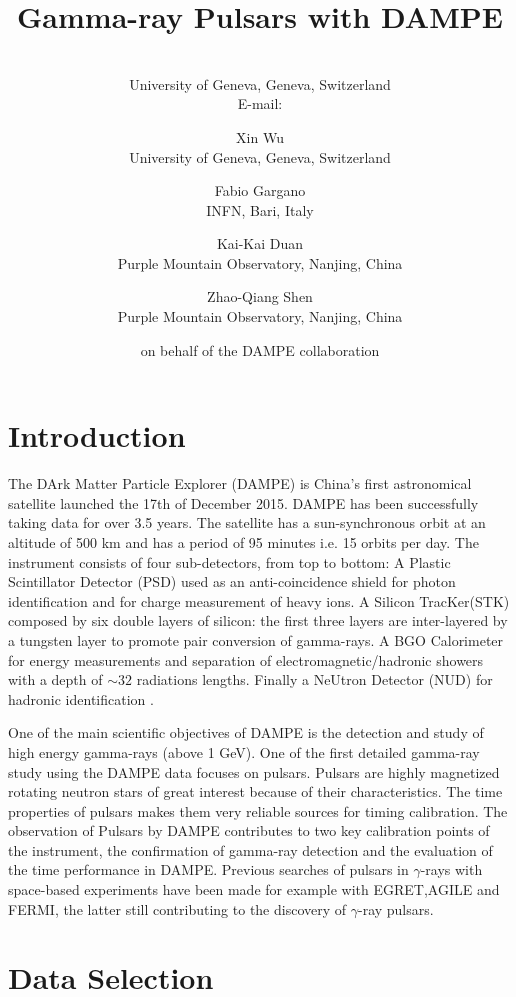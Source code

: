 \documentclass{PoS}
\title{Gamma-ray Pulsars with DAMPE}
\author{\speaker{Maria Munoz}\\
        University of Geneva, Geneva, Switzerland\\
        E-mail: \email{maria.munoz@unige.ch}}
\author{Xin Wu\\
        University of Geneva, Geneva, Switzerland}
\author{Fabio Gargano\\
        INFN, Bari, Italy}
\author{Kai-Kai Duan\\
        Purple Mountain Observatory, Nanjing, China}
\author{Zhao-Qiang Shen\\
        Purple Mountain Observatory, Nanjing, China}
\author{on behalf of the DAMPE collaboration}
\begin{document}


\section{Introduction}


The DArk Matter Particle Explorer (DAMPE) is China's first astronomical satellite launched the 17th of December 2015. DAMPE has been successfully taking data for over 3.5 years.
The satellite has a sun-synchronous orbit at an altitude of  500 km and  has a period of 95 minutes i.e. 15 orbits per day.
The instrument consists of four sub-detectors, from top to bottom: A Plastic Scintillator Detector (PSD) used as an anti-coincidence shield for photon identification and for charge measurement of heavy ions.
A Silicon TracKer(STK) composed by six double layers of silicon: the first three layers are inter-layered  by a tungsten layer to promote pair conversion of gamma-rays.  A BGO Calorimeter for energy measurements and separation of electromagnetic/hadronic showers with a depth of $\sim 32$ radiations lengths. Finally a NeUtron Detector (NUD) for  hadronic identification \cite{dampe_mission}.

One of the main scientific objectives of DAMPE is the detection and study of  high energy gamma-rays (above 1 GeV). One of the first detailed gamma-ray study using the DAMPE data focuses on pulsars. Pulsars are highly magnetized rotating neutron stars of great interest because of their characteristics. The time  properties of pulsars makes them very reliable sources for timing calibration. The observation of Pulsars by DAMPE contributes to two key calibration points of the instrument, the confirmation of gamma-ray detection and the  evaluation of the time  performance in DAMPE.
Previous searches of pulsars  in  $\gamma$-rays  with space-based experiments have been made for example  with   EGRET,AGILE and  FERMI\cite{2catalogfermi}, the latter still contributing to the discovery of $\gamma$-ray pulsars.


\section{Data Selection}
\label{selection}
\end{document}
